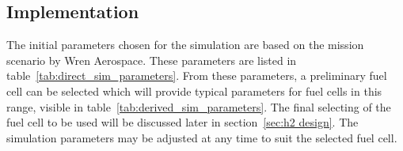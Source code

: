 \subsection*{Implementation}
The initial parameters chosen for the simulation are based on the mission scenario by Wren Aerospace. These parameters are listed in table~\ref{tab:direct_sim_parameters}. From these parameters, a preliminary fuel cell can be selected which will provide typical parameters for fuel cells in this range, visible in table~\ref{tab:derived_sim_parameters}. The final selecting of the fuel cell to be used will be discussed later in section~\ref{sec:h2 design}. The simulation parameters may be adjusted at any time to suit the selected fuel cell.

\newcommand{\simpar}[3]{#1 & #2 & #3\\}

